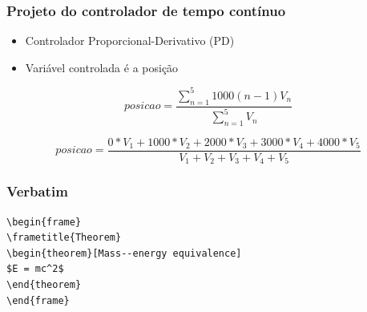 \begin{frame}
\frametitle{Projeto do controlador de tempo contínuo}

\begin{itemize}
\item Controlador Proporcional-Derivativo (PD)
\item Variável controlada é a posição
\end{itemize}

\begin{equation}\label{eq:posicao}
posicao = \frac{\sum_{n=1}^{5} 1000(n-1)V_{n}}{\sum_{n=1}^{5} V_{n}}
\end{equation}

\begin{equation}\label{eq:posicao2}
posicao = \frac{0*V_{1} + 1000*V_{2} + 2000*V_{3} + 3000*V_{4} + 4000*V_{5} }{V_{1} + V_{2} + V_{3} + V_{4} + V_{5}}
\end{equation}

\end{frame}


%


\begin{frame}[fragile] %
\frametitle{Verbatim}
\begin{example}
\begin{verbatim}
\begin{frame}
\frametitle{Theorem}
\begin{theorem}[Mass--energy equivalence]
$E = mc^2$
\end{theorem}
\end{frame}\end{verbatim}
\end{example}
\end{frame}



